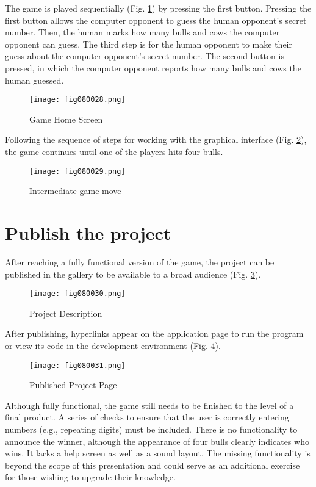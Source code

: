 The game is played sequentially (Fig. \ref{fig080028}) by pressing the first button. Pressing the first button allows the computer opponent to guess the human opponent's secret number. Then, the human marks how many bulls and cows the computer opponent can guess. The third step is for the human opponent to make their guess about the computer opponent's secret number. The second button is pressed, in which the computer opponent reports how many bulls and cows the human guessed.

\begin{figure}[H]
   \centering
   \texttt{[image: fig080028.png]}
   \caption{Game Home Screen}
\label{fig080028}
\end{figure}

Following the sequence of steps for working with the graphical interface (Fig. \ref{fig080029}), the game continues until one of the players hits four bulls.

\begin{figure}[H]
   \centering
   \texttt{[image: fig080029.png]}
   \caption{Intermediate game move}
\label{fig080029}
\end{figure}

\section{Publish the project}

After reaching a fully functional version of the game, the project can be published in the gallery to be available to a broad audience (Fig. \ref{fig080030}).

\begin{figure}[H]
   \centering
   \texttt{[image: fig080030.png]}
   \caption{Project Description}
\label{fig080030}
\end{figure}

After publishing, hyperlinks appear on the application page to run the program or view its code in the development environment (Fig. \ref{fig080031}).

\begin{figure}[H]
   \centering
   \texttt{[image: fig080031.png]}
   \caption{Published Project Page}
\label{fig080031}
\end{figure}

Although fully functional, the game still needs to be finished to the level of a final product. A series of checks to ensure that the user is correctly entering numbers (e.g., repeating digits) must be included. There is no functionality to announce the winner, although the appearance of four bulls clearly indicates who wins. It lacks a help screen as well as a sound layout. The missing functionality is beyond the scope of this presentation and could serve as an additional exercise for those wishing to upgrade their knowledge.
